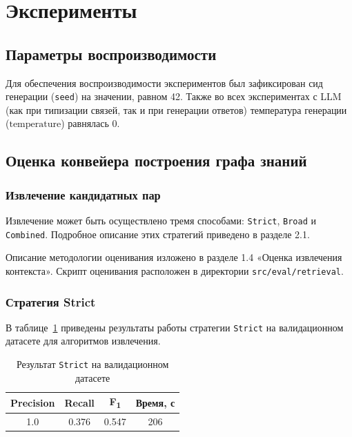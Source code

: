 \clearpage
\section{Эксперименты}
\subsection{Параметры воспроизводимости}

Для обеспечения воспроизводимости экспериментов
был зафиксирован сид генерации (\texttt{seed})
на значении, равном 42.
Также во всех экспериментах с LLM
(как при типизации связей, так и при
генерации ответов)
температура генерации ($\text{temperature}$)
равнялась $0$.

\subsection{Оценка конвейера построения графа знаний}
\subsubsection{Извлечение кандидатных пар}


Извлечение может быть осуществлено тремя способами: \texttt{Strict}, \texttt{Broad} и \texttt{Combined}.
Подробное описание этих стратегий приведено в разделе 2.1.

Описание методологии оценивания изложено в разделе 1.4 «Оценка извлечения контекста».
Скрипт оценивания расположен в директории \texttt{src/eval/retrieval}.

\subsubsection*{Стратегия Strict}
В таблице~\ref{tab:strict_retrieval} приведены результаты работы стратегии
\texttt{Strict} на валидационном датасете для алгоритмов извлечения.

\begin{table}[H]
    \caption{Результат \texttt{Strict} на валидационном датасете}
    \label{tab:strict_retrieval}
    \centering
    \begin{tabular}{cccc}
        \hline
        \textbf{Precision} & \textbf{Recall} & \textbf{F\textsubscript{1}} & \textbf{Время, с} \\
        \hline
        1.0                & 0.376           & 0.547                       & 206               \\
        \hline
    \end{tabular}
\end{table}

